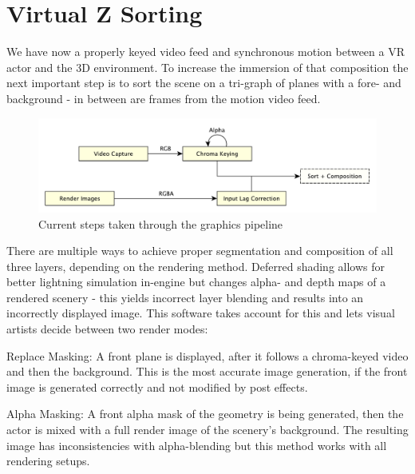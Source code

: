 %
\section{Virtual Z Sorting}

We have now a properly keyed video feed and synchronous motion between a VR 
actor and the 3D environment. To increase the immersion of that composition the 
next important step is to sort the scene on a tri-graph of planes with a fore- 
and background - in between are frames from the motion video feed.

\begin{figure}[h]
	\includegraphics[width=\textwidth]{gfx/pipeline/4_5_composition.pdf}
	\caption{Current steps taken through the graphics pipeline}
	\label{fig:steps:composition}
\end{figure}

There are multiple ways to achieve proper segmentation and composition of all 
three layers, depending on the rendering method. Deferred shading allows for 
better lightning simulation in-engine but changes alpha- and depth maps of a 
rendered scenery - this yields incorrect layer blending and results into an 
incorrectly displayed image. This software takes account for this and lets 
visual artists decide between two render modes:

\begin{my_list}
	\item Replace Masking: A front plane is displayed, after it follows a 
	chroma-keyed video and then the background. This is the most accurate image 
	generation, if the front image is generated correctly and not modified by 
	post effects.
	\item Alpha Masking: A front alpha mask of the geometry is being generated, 
	then the actor is mixed with a full render image of the scenery's
	background. The resulting image has inconsistencies with alpha-blending but 
	this method works with all rendering setups.
\end{my_list}

